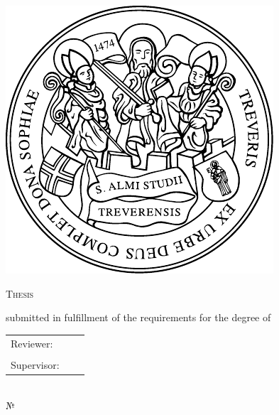 
\makeatletter

\begin{titlepage}
    \centering

    \includegraphics[width=0.2\linewidth]{assets/logo}

    {\huge\scshape \university{}\par}
    \vfill


    {\huge\sffamily\bfseries \@title\par}
    \vfill

    {\huge\scshape Thesis\par}
    \vspace{1ex}

    submitted in fulfillment of the requirements for the degree of\\
    \degree{}\par
    \vfill


    \begin{tabular}{lcl}
        Reviewer:   &  & \reviewerOne{} \\
                    &  & \reviewerTwo{} \\[.5ex]
        Supervisor: &  & \supervisor{}  \\
    \end{tabular}
    \vfill

    {\Large\itshape \@author\par} %
    \vspace{.5ex}

    \address{}\\
    № \matriculationNumber{}\\
    \emailAddress{}\\
    \vfill

    {\Large \@date\par}
\end{titlepage}

\makeatother
